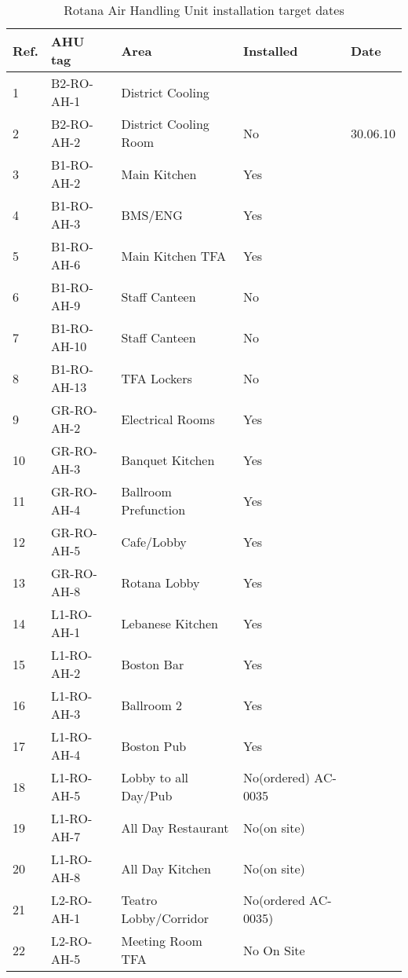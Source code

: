 \begin{table}[htbp]
\label{tbl:AHUrotana}
\footnotesize
\caption{Rotana Air Handling Unit installation target dates}
\begin{tabular}{lll p{2cm}p{1.8cm}}
\toprule
Ref.	  &AHU tag 	 &Area	 &Installed	  &Date\\
\midrule
 1	 &B2-RO-AH-1   &District Cooling &  &\\	
  2	 &B2-RO-AH-2	 &District Cooling Room &No	 &30.06.10\\
\midrule 

3	 &B1-RO-AH-2	 &Main Kitchen	                 & Yes	 	 &\ahufour\\
 4	 &B1-RO-AH-3	 &BMS/ENG	 &Yes	 	                         &\ahufour\\
 5	  &B1-RO-AH-6	 &Main Kitchen TFA	 &Yes	 	 &\ahufour\\
 6	  &B1-RO-AH-9	 &Staff Canteen	 &No	 	 &\ahufour\\
 7	  &B1-RO-AH-10 &Staff Canteen	 &No	 	 &\ahufour\\
 8	  &B1-RO-AH-13 &TFA Lockers	             &No	 	 &\ahufour\\
\midrule
 9	  &GR-RO-AH-2	 &Electrical Rooms	 &Yes	 	 &\ahufour\\
\midrule
10	  &GR-RO-AH-3	 &Banquet Kitchen	 &Yes	 	 &\ahufour\\
 11	  &GR-RO-AH-4	 &Ballroom Prefunction	 &Yes	 	 &\ahufour\\
 12	  &GR-RO-AH-5	 &Cafe/Lobby	 &Yes	 	             &\ahufour\\
 13	 	 &GR-RO-AH-8	 &Rotana Lobby	 &Yes	 	             &\ahufour\\
\midrule
 14	 	 &L1-RO-AH-1    &Lebanese Kitchen	 &Yes	 & \ahuthree\\
 15	 	 &L1-RO-AH-2	 &Boston Bar	 &Yes	 &\ahuthree\\
 16	 	 &L1-RO-AH-3	 &Ballroom 2	 &Yes	 &\ahuthree\\
 17	 	 &L1-RO-AH-4	 &Boston Pub	 &Yes	 &\ahufour \\     
 18	 	 &L1-RO-AH-5	 &Lobby to all Day/Pub	 &No(ordered)	 AC-0035	 &\ahuthree\\
 19	 	 &L1-RO-AH-7	 &All Day Restaurant	 &No(on site)	 &\ahuthree\\
 20	 	 &L1-RO-AH-8	 &All Day Kitchen	 &No(on site)	 &\ahuthree\\
\midrule
 21	 	 &L2-RO-AH-1	 &Teatro Lobby/Corridor &No(ordered AC-0035)	 &\ahufive\\	 
 22	 	 &L2-RO-AH-5	 &Meeting Room TFA	 &No	 On Site	 &\ahutwo\\

\end{tabular}
\end{table}
